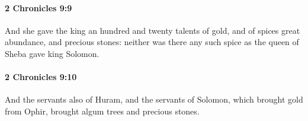 		\paragraph{2 Chronicles 9:9} %
			\label{2CHRONICLES-9-9}

			And she gave the king an hundred and twenty talents of gold, and of spices great abundance, and precious stones: neither was there any such spice as the queen of Sheba gave king Solomon.


		\paragraph{2 Chronicles 9:10} %
			\label{2CHRONICLES-9-10}

			And the servants also of Huram, and the servants of Solomon, which brought gold from Ophir, brought algum trees and precious stones.


